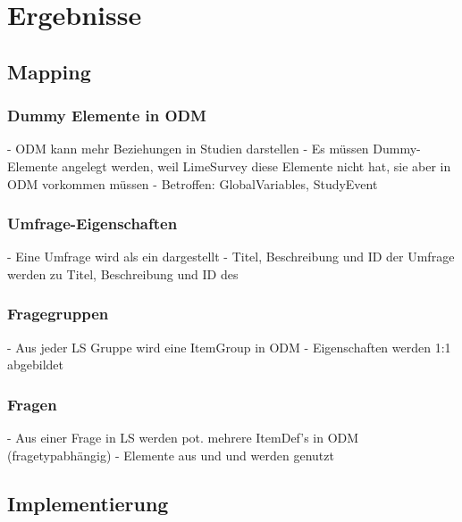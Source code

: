 \chapter{Ergebnisse}
\label{ch:ergebnisse}

\section{Mapping}

\subsection{Dummy Elemente in ODM}

- ODM kann mehr Beziehungen in Studien darstellen
- Es müssen Dummy-Elemente angelegt werden, weil LimeSurvey diese Elemente nicht hat, sie aber in ODM vorkommen müssen
- Betroffen: GlobalVariables, StudyEvent

\subsection{Umfrage-Eigenschaften}

- Eine Umfrage wird als ein  dargestellt
- Titel, Beschreibung und ID der Umfrage werden zu Titel, Beschreibung und ID des 

\subsection{Fragegruppen}

- Aus jeder LS Gruppe wird eine ItemGroup in ODM
- Eigenschaften werden 1:1 abgebildet

\subsection{Fragen}

- Aus einer Frage in LS werden pot. mehrere ItemDef's in ODM (fragetypabhängig)
- Elemente aus  und  und  werden genutzt

\section{Implementierung}



